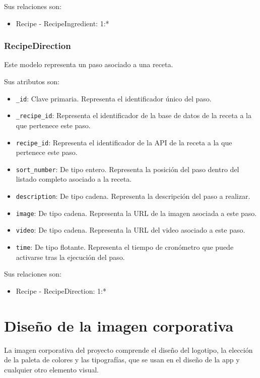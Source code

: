 Sus relaciones son:
\begin{itemize}
\item Recipe - RecipeIngredient: 1:*
\end{itemize}


\subsubsection{RecipeDirection}

Este modelo representa un paso asociado a una receta.

Sus atributos son:
\begin{itemize}
\item \texttt{\_id}: Clave primaria. Representa el identificador único del
  paso.
\item \texttt{\_recipe\_id}: Representa el identificador de la base de datos de
  la receta a la que pertenece este paso.
\item \texttt{recipe\_id}: Representa el identificador de la API de la receta
  a la que pertenece este paso.
\item \texttt{sort\_number}: De tipo entero. Representa la posición del
  paso dentro del listado completo asociado a la receta.
\item \texttt{description}: De tipo cadena. Representa la descripción del paso
  a realizar.
\item \texttt{image}: De tipo cadena. Representa la URL de la imagen asociada a
  este paso.
\item \texttt{video}: De tipo cadena. Representa la URL del video asociado a este
  paso.
\item \texttt{time}: De tipo flotante. Representa el tiempo de cronómetro que
  puede activarse tras la ejecución del paso.
\end{itemize}

Sus relaciones son:
\begin{itemize}
\item Recipe - RecipeDirection: 1:*
\end{itemize}


\section{Diseño de la imagen corporativa}

La imagen corporativa del proyecto comprende el diseño del logotipo, la elección
de la paleta de colores y las tipografías, que se usan en el diseño de la app y
cualquier otro elemento visual.

